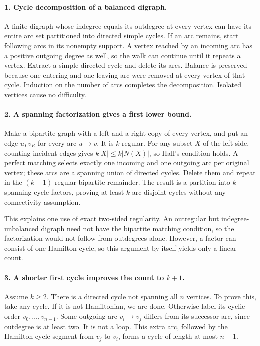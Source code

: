 \documentclass[11pt,a4paper]{article}
\begin{document}
\paragraph{1. Cycle decomposition of a balanced digraph.}
A finite digraph whose indegree equals its outdegree at every vertex
can have its entire arc set partitioned into directed simple cycles.
If an arc remains, start following arcs in its nonempty support.
A vertex reached by an incoming arc has a positive outgoing degree
as well, so the walk can continue until it repeats a vertex. Extract
a simple directed cycle and delete its arcs. Balance is preserved
because one entering and one leaving arc were removed at every
vertex of that cycle. Induction on the number of arcs completes the
decomposition. Isolated vertices cause no difficulty.

\paragraph{2. A spanning factorization gives a first lower bound.}
Make a bipartite graph with a left and a right copy of every vertex,
and put an edge $u_Lv_R$ for every arc $u\to v$. It is $k$-regular.
For any subset $X$ of the left side, counting incident edges gives
$k|X|\le k|N(X)|$, so Hall's condition holds. A perfect matching
selects exactly one incoming and one outgoing arc per original
vertex; these arcs are a spanning union of directed cycles.
Delete them and repeat in the $(k-1)$-regular bipartite remainder.
The result is a partition into $k$ spanning cycle factors, proving
at least $k$ arc-disjoint cycles without any connectivity assumption.

This explains one use of exact two-sided regularity. An outregular
but indegree-unbalanced digraph need not have the bipartite matching
condition, so the factorization would not follow from outdegrees
alone. However, a factor can consist of one Hamilton cycle, so this
argument by itself yields only a linear count.

\paragraph{3. A shorter first cycle improves the count to $k+1$.}
Assume $k\ge2$. There is a directed cycle not spanning all $n$
vertices. To prove this, take any cycle. If it is not Hamiltonian,
we are done. Otherwise label its cyclic order $v_0,\ldots,v_{n-1}$.
Some outgoing arc $v_i\to v_j$ differs from its successor arc,
since outdegree is at least two. It is not a loop. This extra arc,
followed by the Hamilton-cycle segment from $v_j$ to $v_i$, forms
a cycle of length at most $n-1$.
\end{document}
